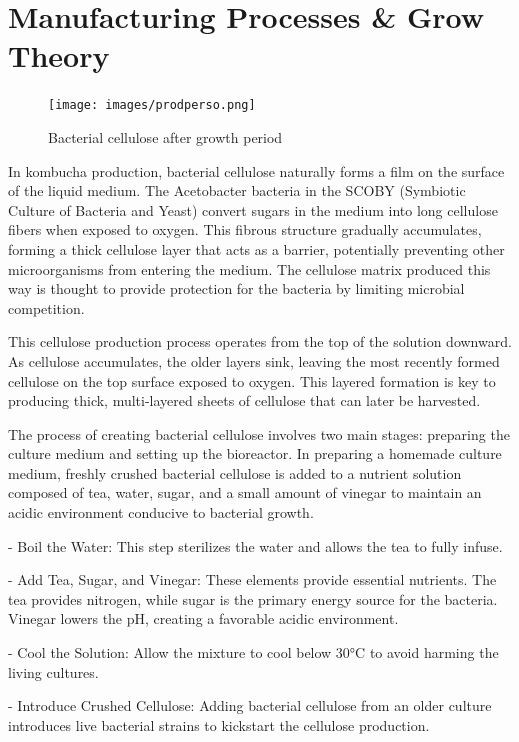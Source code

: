 \section{Manufacturing Processes \& Grow Theory}


\begin{figure}[h]
    \centering
    \texttt{[image: images/prodperso.png]}
    \caption{Bacterial cellulose after growth period}
    \label{fig:manufactureperso}
\end{figure} 

In kombucha production, bacterial cellulose naturally forms a film on the surface of the liquid medium. The Acetobacter bacteria in the SCOBY (Symbiotic Culture of Bacteria and Yeast) convert sugars in the medium into long cellulose fibers when exposed to oxygen. This fibrous structure gradually accumulates, forming a thick cellulose layer that acts as a barrier, potentially preventing other microorganisms from entering the medium. The cellulose matrix produced this way is thought to provide protection for the bacteria by limiting microbial competition.

This cellulose production process operates from the top of the solution downward. As cellulose accumulates, the older layers sink, leaving the most recently formed cellulose on the top surface exposed to oxygen. This layered formation is key to producing thick, multi-layered sheets of cellulose that can later be harvested.

The process of creating bacterial cellulose involves two main stages: preparing the culture medium and setting up the bioreactor. In preparing a homemade culture medium, freshly crushed bacterial cellulose is added to a nutrient solution composed of tea, water, sugar, and a small amount of vinegar to maintain an acidic environment conducive to bacterial growth.

\-- Boil the Water: This step sterilizes the water and allows the tea to fully infuse.

\-- Add Tea, Sugar, and Vinegar: These elements provide essential nutrients. The tea provides nitrogen, while sugar is the primary energy source for the bacteria. Vinegar lowers the pH, creating a favorable acidic environment.

\-- Cool the Solution: Allow the mixture to cool below 30°C to avoid harming the living cultures.

\-- Introduce Crushed Cellulose: Adding bacterial cellulose from an older culture introduces live bacterial strains to kickstart the cellulose production.

